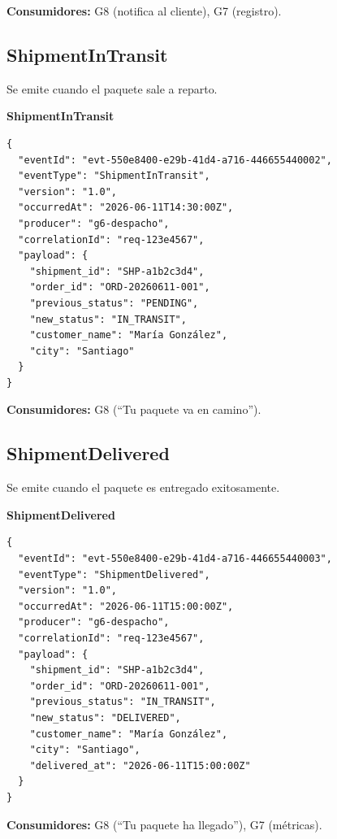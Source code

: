\documentclass[11pt, a4paper]{article}
\newcommand{\contractheader}[1]{%
  \noindent\colorbox{primary!10}{%
    \parbox{\dimexpr\textwidth-2\fboxsep}{%
      \textbf{\faFileCode\quad #1}%
    }%
  }
  \vspace{0.3cm}
}
\begin{document}
\textbf{Consumidores:} G8 (notifica al cliente), G7 (registro).

\vspace{0.4cm}

\subsection{ShipmentInTransit}

Se emite cuando el paquete sale a reparto.

\contractheader{ShipmentInTransit}

\begin{lstlisting}
{
  "eventId": "evt-550e8400-e29b-41d4-a716-446655440002",
  "eventType": "ShipmentInTransit",
  "version": "1.0",
  "occurredAt": "2026-06-11T14:30:00Z",
  "producer": "g6-despacho",
  "correlationId": "req-123e4567",
  "payload": {
    "shipment_id": "SHP-a1b2c3d4",
    "order_id": "ORD-20260611-001",
    "previous_status": "PENDING",
    "new_status": "IN_TRANSIT",
    "customer_name": "María González",
    "city": "Santiago"
  }
}
\end{lstlisting}

\textbf{Consumidores:} G8 (``Tu paquete va en camino'').

\vspace{0.4cm}

\subsection{ShipmentDelivered}

Se emite cuando el paquete es entregado exitosamente.

\contractheader{ShipmentDelivered}

\begin{lstlisting}
{
  "eventId": "evt-550e8400-e29b-41d4-a716-446655440003",
  "eventType": "ShipmentDelivered",
  "version": "1.0",
  "occurredAt": "2026-06-11T15:00:00Z",
  "producer": "g6-despacho",
  "correlationId": "req-123e4567",
  "payload": {
    "shipment_id": "SHP-a1b2c3d4",
    "order_id": "ORD-20260611-001",
    "previous_status": "IN_TRANSIT",
    "new_status": "DELIVERED",
    "customer_name": "María González",
    "city": "Santiago",
    "delivered_at": "2026-06-11T15:00:00Z"
  }
}
\end{lstlisting}

\textbf{Consumidores:} G8 (``Tu paquete ha llegado''), G7 (métricas).
\end{document}
